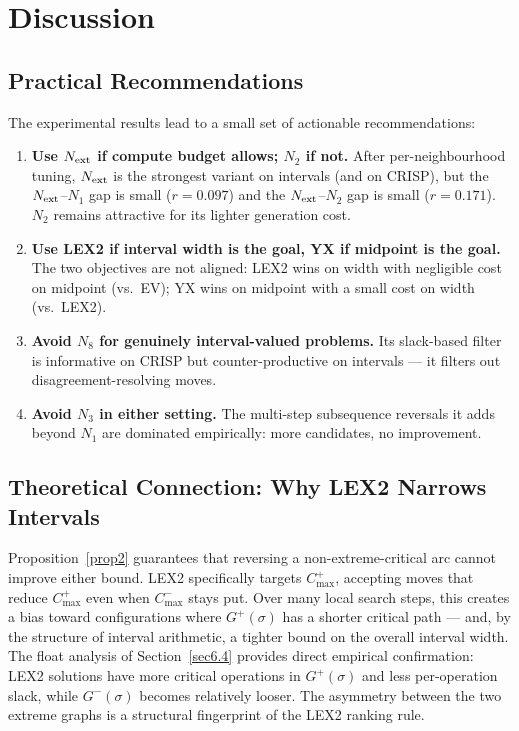 \documentclass[preprint,12pt]{elsarticle}
\begin{document}
\section{Discussion}
\label{sec7}

\subsection{Practical Recommendations}
\label{sec7.1}

The experimental results lead to a small set of actionable recommendations:
\begin{enumerate}
\item \textbf{Use $N_{\rm ext}$ if compute budget allows; $N_2$ if not.} After per-neighbourhood tuning, $N_{\rm ext}$ is the strongest variant on intervals (and on CRISP), but the $N_{\rm ext}$--$N_1$ gap is small ($r = 0.097$) and the $N_{\rm ext}$--$N_2$ gap is small ($r = 0.171$). $N_2$ remains attractive for its lighter generation cost.
\item \textbf{Use LEX2 if interval width is the goal, YX if midpoint is the goal.} The two objectives are not aligned: LEX2 wins on width with negligible cost on midpoint (vs.\ EV); YX wins on midpoint with a small cost on width (vs.\ LEX2).
\item \textbf{Avoid $N_8$ for genuinely interval-valued problems.} Its slack-based filter is informative on CRISP but counter-productive on intervals --- it filters out disagreement-resolving moves.
\item \textbf{Avoid $N_3$ in either setting.} The multi-step subsequence reversals it adds beyond $N_1$ are dominated empirically: more candidates, no improvement.
\end{enumerate}

\subsection{Theoretical Connection: Why LEX2 Narrows Intervals}
\label{sec7.2}

Proposition~\ref{prop2} guarantees that reversing a non-extreme-critical arc cannot improve either bound. LEX2 specifically targets $C^+_{\max}$, accepting moves that reduce $C^+_{\max}$ even when $C^-_{\max}$ stays put. Over many local search steps, this creates a bias toward configurations where $G^+(\sigma)$ has a shorter critical path --- and, by the structure of interval arithmetic, a tighter bound on the overall interval width. The float analysis of Section~\ref{sec6.4} provides direct empirical confirmation: LEX2 solutions have more critical operations in $G^+(\sigma)$ and less per-operation slack, while $G^-(\sigma)$ becomes relatively looser. The asymmetry between the two extreme graphs is a structural fingerprint of the LEX2 ranking rule.
\end{document}
